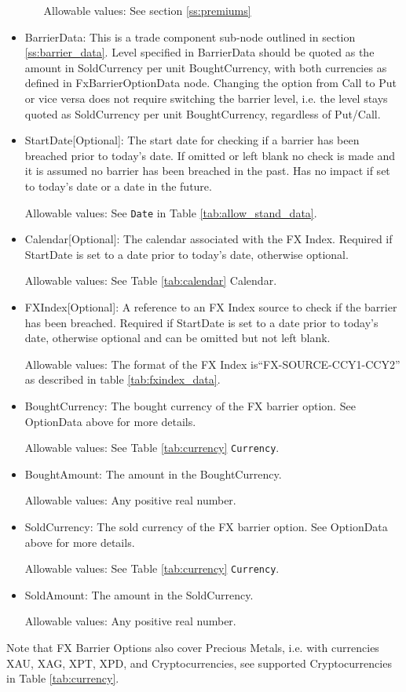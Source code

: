\begin{itemize}
\begin{itemize}
Allowable values:  See section \ref{ss:premiums}

\end{itemize}



\item BarrierData: This is a trade component sub-node outlined in section \ref{ss:barrier_data}.
Level specified in BarrierData should be quoted as the amount in SoldCurrency per unit BoughtCurrency, with both currencies as defined in FxBarrierOptionData node.
Changing the option from Call to Put or vice versa does not require switching the barrier level, i.e. the level stays quoted as SoldCurrency per unit BoughtCurrency, regardless of Put/Call.

\item StartDate[Optional]: The start date for checking if a barrier has been breached prior to today's date.  If omitted or left blank no check is made and it is assumed no barrier has been breached in the past. Has no impact if set to today's date or a date in the future.

Allowable values:  See \lstinline!Date! in Table \ref{tab:allow_stand_data}.

\item Calendar[Optional]: The calendar associated with the FX Index. Required if StartDate is set to a date prior to today's date, otherwise optional.

Allowable values: See Table \ref{tab:calendar} Calendar.

\item FXIndex[Optional]: A reference to an FX Index source to check if the barrier has been breached. Required if StartDate is set to a date prior to today's date, otherwise optional and can be omitted but not left blank.

Allowable values:  The format of the FX Index is``FX-SOURCE-CCY1-CCY2'' as described in table \ref{tab:fxindex_data}. 

\item BoughtCurrency: The bought currency of the FX barrier option. See OptionData above for more details.

Allowable values:  See Table \ref{tab:currency} \lstinline!Currency!.

\item BoughtAmount: The amount in the BoughtCurrency.  

Allowable values:  Any positive real number.

\item SoldCurrency: The sold currency of the FX barrier option. See OptionData above for more details.

Allowable values:  See Table \ref{tab:currency} \lstinline!Currency!.

\item SoldAmount: The amount in the SoldCurrency.  

Allowable values:  Any positive real number.

\end{itemize}

Note that FX Barrier Options also cover Precious Metals, i.e. with
currencies XAU, XAG, XPT, XPD, and Cryptocurrencies,  see supported Cryptocurrencies in Table \ref{tab:currency}.